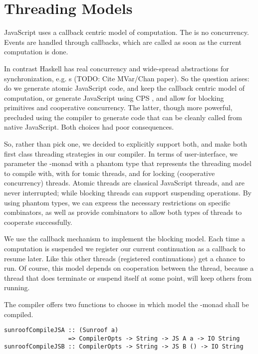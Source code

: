  
\section{Threading Models}
\label{sec:threading-models}

JavaScript uses a callback centric model of computation. The 
is no concurrency. Events are handled through callbacks,
which are called as soon as the current computation is done.

In contrast Haskell has real concurrency and wide-spread 
abstractions for synchronization, e.g. s (TODO: Cite MVar/Chan paper).
So the question arises: do we generate atomic JavaScript code, 
and keep the callback centric model of computation, or generate JavaScript
using CPS \cite{Claessen:99:PoorMansConcurrencyMonad}, 
and allow for blocking primitives and
cooperative concurrency. The latter, though more powerful, 
precluded using the compiler to generate
code that can be cleanly called from native JavaScript.
Both choices had poor consequences.

So, rather than pick one, we decided to explicitly support both,
and make both first class threading strategies in our compiler.
In terms of user-interface, we parameter the \JS-monad
with a phantom type that represents the threading model
to compile with, with  for tomic threads,
and  for locking (cooperative concurrency) threads. 
Atomic threads are classical JavaScript threads, and
are never interrupted; while blocking threads can
support suspending operations. By using phantom
types, we can express the necessary
restrictions on specific combinators, as well
as provide combinators to allow both types of
threads to cooperate successfully.

We use the callback mechanism to implement the blocking model.
Each time a computation is suspended we register our current
continuation as a callback to resume later. Like this other 
threads (registered continuations) get a chance to run.
Of course, this model depends on cooperation between the thread,
because a thread that does terminate or suspend itself at some
point, will keep others from running.

The compiler offers two functions to choose in which
model the \JS-monad shall be compiled.
\begin{verbatim}
sunroofCompileJSA :: (Sunroof a) 
                  => CompilerOpts -> String -> JS A a -> IO String
sunroofCompileJSB :: CompilerOpts -> String -> JS B () -> IO String
\end{verbatim}

